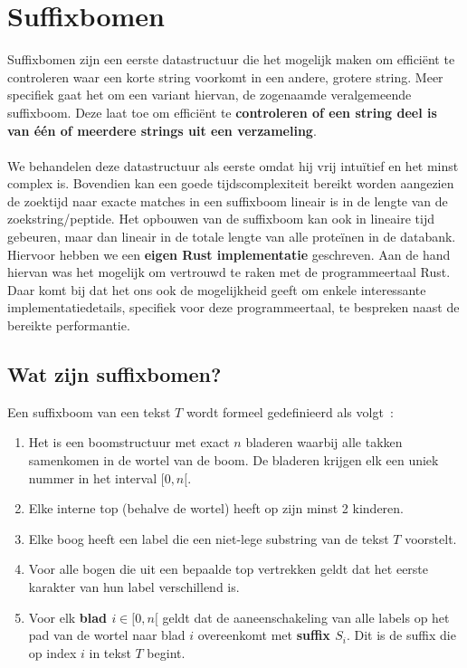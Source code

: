 \chapter{Suffixbomen}\label{ch:suffix-bomen}
Suffixbomen zijn een eerste datastructuur die het mogelijk maken om efficiënt te controleren waar een korte string voorkomt in een andere, grotere string.
Meer specifiek gaat het om een variant hiervan, de zogenaamde veralgemeende suffixboom.
Deze laat toe om efficiënt te \textbf{controleren of een string deel is van één of meerdere strings uit een verzameling}.
\\ \\
We behandelen deze datastructuur als eerste omdat hij vrij intuïtief en het minst complex is.
Bovendien kan een goede tijdscomplexiteit bereikt worden aangezien de zoektijd naar exacte matches in een suffixboom lineair is in de lengte van de zoekstring/peptide.
Het opbouwen van de suffixboom kan ook in lineaire tijd gebeuren, maar dan lineair in de totale lengte van alle proteïnen in de databank.
Hiervoor hebben we een \textbf{eigen Rust implementatie} geschreven.
Aan de hand hiervan was het mogelijk om vertrouwd te raken met de programmeertaal Rust.
Daar komt bij dat het ons ook de mogelijkheid geeft om enkele interessante implementatiedetails, specifiek voor deze programmeertaal, te bespreken naast de bereikte performantie.

\section{Wat zijn suffixbomen?}\label{sec:wat-zijn-suffix-bomen?}
Een suffixboom van een tekst $T$ wordt formeel gedefinieerd als volgt~\cite{CCB_course}:
\begin{enumerate}
    \item Het is een boomstructuur met exact $n$ bladeren waarbij alle takken samenkomen in de wortel van de boom.
    De bladeren krijgen elk een uniek nummer in het interval $[0, n[$.
    \item Elke interne top (behalve de wortel) heeft op zijn minst 2 kinderen.
    \item Elke boog heeft een label die een niet-lege substring van de tekst $T$ voorstelt.
    \item Voor alle bogen die uit een bepaalde top vertrekken geldt dat het eerste karakter van hun label verschillend is.
    \item Voor elk \textbf{blad $i \in [0, n[$} geldt dat de aaneenschakeling van alle labels op het pad van de wortel naar blad $i$ overeenkomt met \textbf{suffix $S_i$}.
    Dit is de suffix die op index $i$ in tekst $T$ begint.
\end{enumerate}

